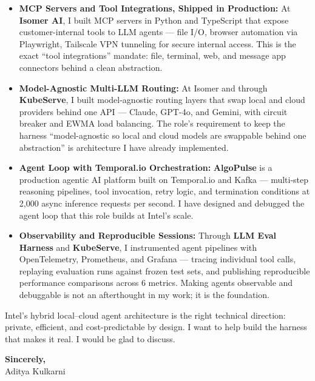 \documentclass[11pt,letterpaper]{article}
\begin{document}
\begin{itemize}[leftmargin=*, itemsep=3pt, label={\color{IntelBlue}\faAngleRight}]
    \item \textbf{MCP Servers and Tool Integrations, Shipped in Production:} At \textbf{Isomer AI}, I built MCP servers in Python and TypeScript that expose customer-internal tools to LLM agents --- file I/O, browser automation via Playwright, Tailscale VPN tunneling for secure internal access. This is the exact ``tool integrations'' mandate: file, terminal, web, and message app connectors behind a clean abstraction.

    \item \textbf{Model-Agnostic Multi-LLM Routing:} At Isomer and through \textbf{KubeServe}, I built model-agnostic routing layers that swap local and cloud providers behind one API --- Claude, GPT-4o, and Gemini, with circuit breaker and EWMA load balancing. The role's requirement to keep the harness ``model-agnostic so local and cloud models are swappable behind one abstraction'' is architecture I have already implemented.

    \item \textbf{Agent Loop with Temporal.io Orchestration:} \textbf{AlgoPulse} is a production agentic AI platform built on Temporal.io and Kafka --- multi-step reasoning pipelines, tool invocation, retry logic, and termination conditions at 2,000 async inference requests per second. I have designed and debugged the agent loop that this role builds at Intel's scale.

    \item \textbf{Observability and Reproducible Sessions:} Through \textbf{LLM Eval Harness} and \textbf{KubeServe}, I instrumented agent pipelines with OpenTelemetry, Prometheus, and Grafana --- tracing individual tool calls, replaying evaluation runs against frozen test sets, and publishing reproducible performance comparisons across 6 metrics. Making agents observable and debuggable is not an afterthought in my work; it is the foundation.
\end{itemize}

\vspace{6pt}

Intel's hybrid local--cloud agent architecture is the right technical direction: private, efficient, and cost-predictable by design. I want to help build the harness that makes it real. I would be glad to discuss.

\vspace{12pt}

\textbf{Sincerely,}\\[8pt]
Aditya Kulkarni
\end{document}
